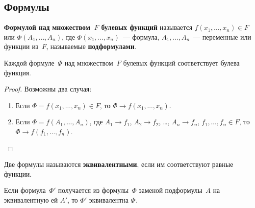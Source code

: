 \subsection{Формулы}
 \textbf{Формулой над множеством~$F$ булевых функций} называется $f(x_1, \ldots, x_n) \in F$ или $\Phi(A_1, \ldots, \allowbreak A_n)$, где $\Phi(x_1, \ldots, x_n)$~--- формула, $A_1, \ldots, A_n$~--- переменные или функции из~$F$, называемые \textbf{подформулами}.

\begin{statement}
Каждой формуле~$\Phi$ над множеством~$F$ булевых функций соответствует булева функция.
\end{statement}
\begin{proof}
Возможны два случая:
\begin{enumerate}
	\item Если $\Phi = f(x_1, \ldots, x_n) \in F$, то $\Phi \to f(x_1, \ldots, x_n)$.
	\item Если $\Phi = f(A_1, \ldots, A_n)$, где $A_1 \to f_1$, $A_2 \to f_2$, \ldots, $A_n \to f_n$, $f_1, \ldots, f_n \in F$, то $\Phi \to f(f_1, \ldots, f_n)$.
\end{enumerate}
\end{proof}

Две формулы называются \textbf{эквивалентными}, если им соответствуют равные функции.

\begin{statement}
Если формула~$\Phi'$ получается из формулы~$\Phi$ заменой подформулы~$A$ на эквивалентную ей $A'$, то $\Phi'$ эквивалентна $\Phi$.
\end{statement}